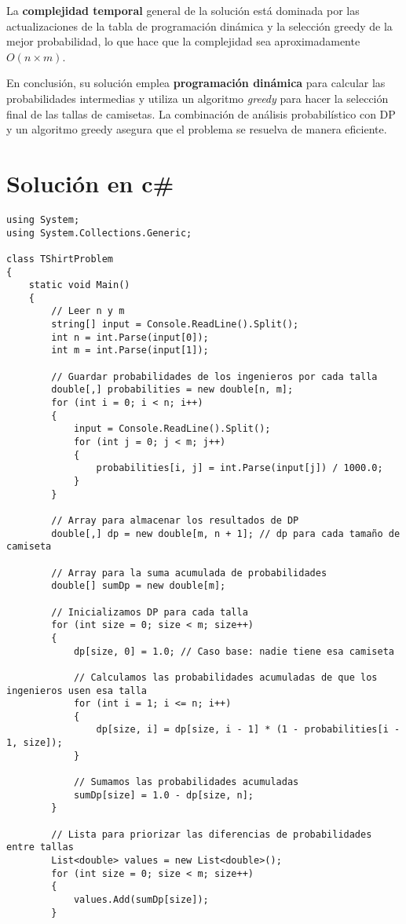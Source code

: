\documentclass{article}
\begin{document}
La \textbf{complejidad temporal} general de la solución está dominada por las actualizaciones de la tabla de programación dinámica y la selección greedy de la mejor probabilidad, lo que hace que la complejidad sea aproximadamente \(O(n \times m)\).

En conclusión, su solución emplea \textbf{programación dinámica} para calcular las probabilidades intermedias y utiliza un algoritmo \textit{greedy} para hacer la selección final de las tallas de camisetas. La combinación de análisis probabilístico con DP y un algoritmo greedy asegura que el problema se resuelva de manera eficiente.
\section{Solución en c\#}
\begin{verbatim}
using System;
using System.Collections.Generic;

class TShirtProblem
{
    static void Main()
    {
        // Leer n y m
        string[] input = Console.ReadLine().Split();
        int n = int.Parse(input[0]);
        int m = int.Parse(input[1]);

        // Guardar probabilidades de los ingenieros por cada talla
        double[,] probabilities = new double[n, m];
        for (int i = 0; i < n; i++)
        {
            input = Console.ReadLine().Split();
            for (int j = 0; j < m; j++)
            {
                probabilities[i, j] = int.Parse(input[j]) / 1000.0;
            }
        }

        // Array para almacenar los resultados de DP
        double[,] dp = new double[m, n + 1]; // dp para cada tamaño de camiseta

        // Array para la suma acumulada de probabilidades
        double[] sumDp = new double[m];

        // Inicializamos DP para cada talla
        for (int size = 0; size < m; size++)
        {
            dp[size, 0] = 1.0; // Caso base: nadie tiene esa camiseta

            // Calculamos las probabilidades acumuladas de que los ingenieros usen esa talla
            for (int i = 1; i <= n; i++)
            {
                dp[size, i] = dp[size, i - 1] * (1 - probabilities[i - 1, size]);
            }

            // Sumamos las probabilidades acumuladas
            sumDp[size] = 1.0 - dp[size, n];
        }

        // Lista para priorizar las diferencias de probabilidades entre tallas
        List<double> values = new List<double>();
        for (int size = 0; size < m; size++)
        {
            values.Add(sumDp[size]);
        }


\end{verbatim}
\end{document}
